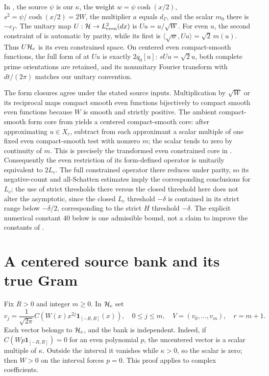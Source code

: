 \documentclass[11pt]{article}
\begin{document}
In \cite[Section~2, equations (4)--(6)]{schubr}, the source $\psi$ is our $\kappa$, the weight $w=\psi\cosh(x/2)$, $s^2=\psi/\cosh(x/2)=2W$, the multiplier $a$ equals $d_\Gamma$, and the scalar $m_0$ there is $-c_\Gamma$. The unitary map $U:\mathcal H\to L^2_{\rm even}(dx)$ is $Uu=u/\sqrt W$. For even $u$, the second constraint of \cite{schubr} is automatic by parity, while its first is $\langle\sqrt w,Uu\rangle=\sqrt2\,m(u)$. Thus $U\mathcal H_c$ is its even constrained space. On centered even compact-smooth functions, the full form of \cite{schubr} at $Uu$ is exactly $2q_0[u]$: $sUu=\sqrt2u$, both complete prime orientations are retained, and its nonunitary Fourier transform with $dt/(2\pi)$ matches our unitary convention.

The form closures agree under the stated source inputs. Multiplication by $\sqrt W$ or its reciprocal maps compact smooth even functions bijectively to compact smooth even functions because $W$ is smooth and strictly positive. The ambient compact-smooth form core from \cite{unified} yields a centered compact-smooth core: after approximating $u\in X_c$, subtract from each approximant a scalar multiple of one fixed even compact-smooth test with nonzero $m$; the scalar tends to zero by continuity of $m$. This is precisely the transformed even constrained core in \cite{schubr}. Consequently the even restriction of its form-defined operator is unitarily equivalent to $2L_c$. The full constrained operator there reduces under parity, so its negative-count and all-Schatten estimates imply the corresponding conclusions for $L_c$; the use of strict thresholds there versus the closed threshold here does not alter the asymptotic, since the closed $L_c$ threshold $-\delta$ is contained in its strict range below $-\delta/2$, corresponding to the strict $H$ threshold $-\delta$. The explicit numerical constant $40$ below is one admissible bound, not a claim to improve the constants of \cite{schubr}.

\section{A centered source bank and its true Gram}\label{bank}
Fix $R>0$ and integer $m\ge0$. In $\mathcal H_c$ set
\begin{equation}\label{bankdef}
 v_j=\frac1{\sqrt{2\pi}}C\!\left(W(x)x^{2j}\mathbf1_{[-R,R]}(x)\right),\quad 0\le j\le m,\quad V=(v_0,\ldots,v_m),\quad r=m+1.
\end{equation}
Each vector belongs to $\mathcal H_c$, and the bank is independent. Indeed, if $C(Wp\mathbf1_{[-R,R]})=0$ for an even polynomial $p$, the uncentered vector is a scalar multiple of $\kappa$. Outside the interval it vanishes while $\kappa>0$, so the scalar is zero; then $W>0$ on the interval forces $p=0$. This proof applies to complex coefficients.
\end{document}
